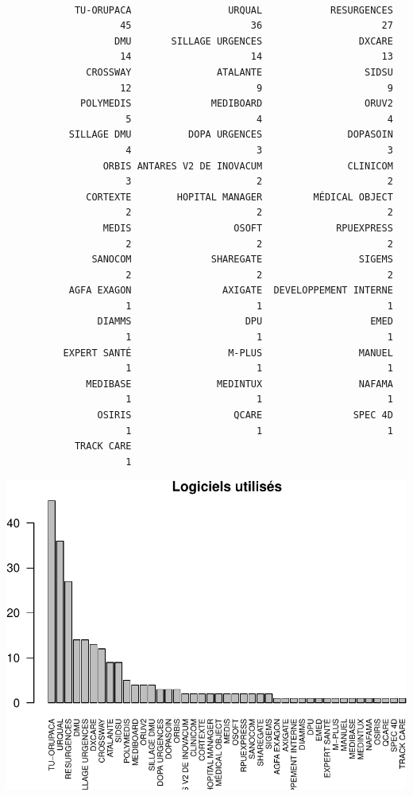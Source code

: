 \documentclass[]{article}
\begin{document}
\begin{verbatim}

            TU-ORUPACA                 URQUAL            RESURGENCES 
                    45                     36                     27 
                   DMU       SILLAGE URGENCES                 DXCARE 
                    14                     14                     13 
              CROSSWAY               ATALANTE                  SIDSU 
                    12                      9                      9 
             POLYMEDIS              MEDIBOARD                  ORUV2 
                     5                      4                      4 
           SILLAGE DMU          DOPA URGENCES               DOPASOIN 
                     4                      3                      3 
                 ORBIS ANTARES V2 DE INOVACUM               CLINICOM 
                     3                      2                      2 
              CORTEXTE        HOPITAL MANAGER         MÉDICAL OBJECT 
                     2                      2                      2 
                 MEDIS                  OSOFT             RPUEXPRESS 
                     2                      2                      2 
               SANOCOM              SHAREGATE                 SIGEMS 
                     2                      2                      2 
           AGFA EXAGON                AXIGATE  DEVELOPPEMENT INTERNE 
                     1                      1                      1 
                DIAMMS                    DPU                   EMED 
                     1                      1                      1 
          EXPERT SANTÉ                 M-PLUS                 MANUEL 
                     1                      1                      1 
              MEDIBASE               MEDINTUX                 NAFAMA 
                     1                      1                      1 
                OSIRIS                  QCARE                SPEC 4D 
                     1                      1                      1 
            TRACK CARE 
                     1 
\end{verbatim}

\includegraphics{septembre2015_files/figure-latex/unnamed-chunk-4-1.pdf}
\end{document}
